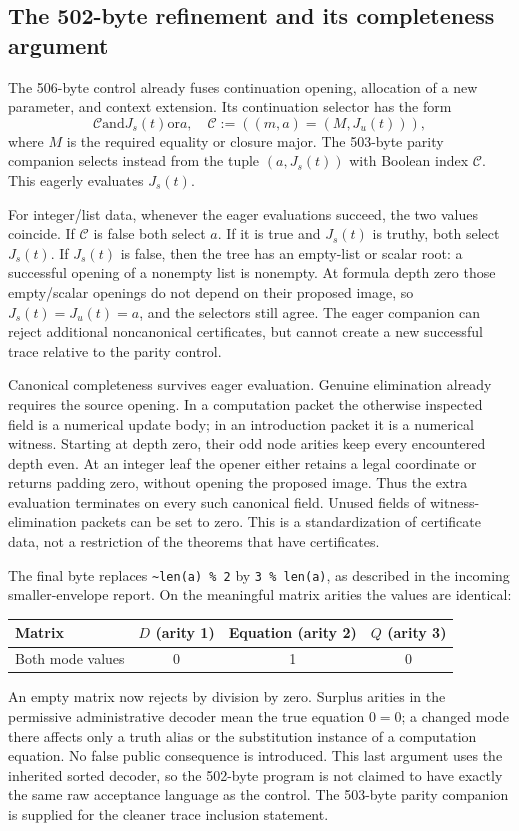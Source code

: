 \documentclass[11pt,letterpaper]{article}
\theoremstyle{definition}
\begin{document}
\subsection{The 502-byte refinement and its completeness argument}

The 506-byte control already fuses continuation opening, allocation of a
new parameter, and context extension. Its continuation selector has the
form
\[
\mathcal C\mathbin{\texttt{ and }}J_s(t)
\mathbin{\texttt{ or }}a,
\quad
\mathcal C:=((m,a)=(M,J_u(t))),
\]
where $M$ is the required equality or closure major. The 503-byte parity
companion selects instead from the tuple $(a,J_s(t))$ with Boolean index
$\mathcal C$. This eagerly evaluates $J_s(t)$.

For integer/list data, whenever the eager evaluations succeed, the two
values coincide. If $\mathcal C$ is false both select $a$. If it is true
and $J_s(t)$ is truthy, both select $J_s(t)$. If $J_s(t)$ is false, then
the tree has an empty-list or scalar root: a successful opening of a
nonempty list is nonempty. At formula depth zero those empty/scalar
openings do not depend on their proposed image, so
$J_s(t)=J_u(t)=a$, and the selectors still agree. The eager companion
can reject additional noncanonical certificates, but cannot create a new
successful trace relative to the parity control.

Canonical completeness survives eager evaluation. Genuine elimination
already requires the source opening. In a computation packet the otherwise
inspected field is a numerical update body; in an introduction packet it
is a numerical witness. Starting at depth zero, their odd node arities
keep every encountered depth even. At an integer leaf the opener either
retains a legal coordinate or returns padding zero, without opening the
proposed image. Thus the extra evaluation terminates on every such
canonical field. Unused fields of witness-elimination packets can be set
to zero. This is a standardization of certificate data, not a restriction
of the theorems that have certificates.

The final byte replaces \texttt{\~{}len(a) \% 2} by
\texttt{3 \% len(a)}, as described in the incoming smaller-envelope
report. On the meaningful matrix arities the values are identical:
\begin{center}
\begin{tabular}{lccc}
\toprule
Matrix & $D$ (arity 1) & Equation (arity 2) & $Q$ (arity 3)\\
\midrule
Both mode values & 0 & 1 & 0\\
\bottomrule
\end{tabular}
\end{center}
An empty matrix now rejects by division by zero. Surplus arities in the
permissive administrative decoder mean the true equation $0=0$; a changed
mode there affects only a truth alias or the substitution instance of a
computation equation. No false public consequence is introduced. This last
argument uses the inherited sorted decoder, so the 502-byte program is
not claimed to have exactly the same raw acceptance language as the
control. The 503-byte parity companion is supplied for the cleaner trace
inclusion statement.
\end{document}
